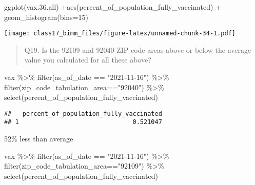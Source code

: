 \documentclass[
]{article}
\newenvironment{Shaded}{\begin{snugshade}}{\end{snugshade}}
\newcommand{\AttributeTok}[1]{\textcolor[rgb]{0.77,0.63,0.00}{#1}}
\newcommand{\DecValTok}[1]{\textcolor[rgb]{0.00,0.00,0.81}{#1}}
\newcommand{\FloatTok}[1]{\textcolor[rgb]{0.00,0.00,0.81}{#1}}
\newcommand{\FunctionTok}[1]{\textcolor[rgb]{0.00,0.00,0.00}{#1}}
\newcommand{\NormalTok}[1]{#1}
\newcommand{\SpecialCharTok}[1]{\textcolor[rgb]{0.00,0.00,0.00}{#1}}
\newcommand{\StringTok}[1]{\textcolor[rgb]{0.31,0.60,0.02}{#1}}
\begin{document}
\begin{Shaded}
\begin{Highlighting}[]
\FunctionTok{ggplot}\NormalTok{(vax.}\FloatTok{36.}\NormalTok{all) }\SpecialCharTok{+}\FunctionTok{aes}\NormalTok{(percent\_of\_population\_fully\_vaccinated) }\SpecialCharTok{+} \FunctionTok{geom\_histogram}\NormalTok{(}\AttributeTok{bins=}\DecValTok{15}\NormalTok{)}
\end{Highlighting}
\end{Shaded}

\texttt{[image: class17\_bimm\_files/figure-latex/unnamed-chunk-34-1.pdf]}

\begin{quote}
Q19. Is the 92109 and 92040 ZIP code areas above or below the average
value you calculated for all these above?
\end{quote}

\begin{Shaded}
\begin{Highlighting}[]
\NormalTok{vax }\SpecialCharTok{\%\textgreater{}\%} \FunctionTok{filter}\NormalTok{(as\_of\_date }\SpecialCharTok{==} \StringTok{"2021{-}11{-}16"}\NormalTok{) }\SpecialCharTok{\%\textgreater{}\%}
\FunctionTok{filter}\NormalTok{(zip\_code\_tabulation\_area}\SpecialCharTok{==}\StringTok{"92040"}\NormalTok{) }\SpecialCharTok{\%\textgreater{}\%}
\FunctionTok{select}\NormalTok{(percent\_of\_population\_fully\_vaccinated)}
\end{Highlighting}
\end{Shaded}

\begin{verbatim}
##   percent_of_population_fully_vaccinated
## 1                               0.521047
\end{verbatim}

52\% less than average

\begin{Shaded}
\begin{Highlighting}[]
\NormalTok{vax }\SpecialCharTok{\%\textgreater{}\%} \FunctionTok{filter}\NormalTok{(as\_of\_date }\SpecialCharTok{==} \StringTok{"2021{-}11{-}16"}\NormalTok{) }\SpecialCharTok{\%\textgreater{}\%}
\FunctionTok{filter}\NormalTok{(zip\_code\_tabulation\_area}\SpecialCharTok{==}\StringTok{"92109"}\NormalTok{) }\SpecialCharTok{\%\textgreater{}\%}
\FunctionTok{select}\NormalTok{(percent\_of\_population\_fully\_vaccinated)}
\end{Highlighting}
\end{Shaded}
\end{document}
